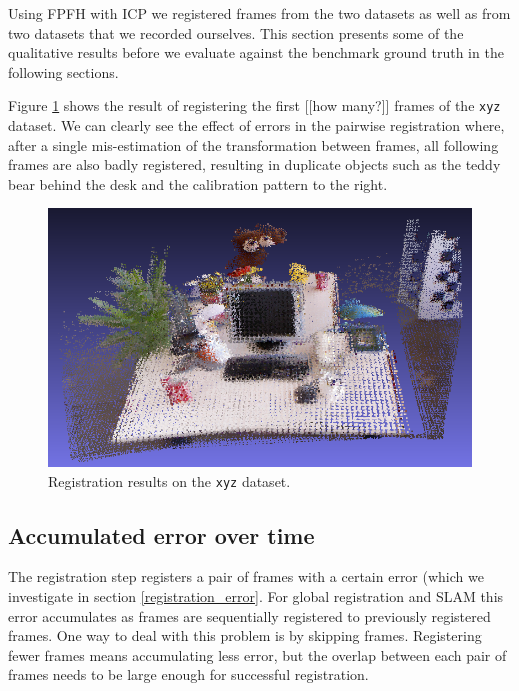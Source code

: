 \documentclass[a4paper]{article}
\begin{document}
Using \ac{FPFH} with \ac{ICP} we registered frames from the two datasets as well as from two datasets that we recorded ourselves. This section presents some of the qualitative results before we evaluate against the benchmark ground truth in the following sections.

Figure \ref{fig:xyz_results} shows the result of registering the first [[how many?]] frames of the \texttt{xyz} dataset. We can clearly see the effect of errors in the pairwise registration where, after a single mis-estimation of the transformation between frames, all following frames are also badly registered, resulting in duplicate objects such as the teddy bear behind the desk and the calibration pattern to the right.

\begin{figure}[htbp]
    \centering
        \includegraphics[width=\textwidth]{ims/xyz_results.png}
    \caption{Registration results on the \texttt{xyz} dataset.}
    \label{fig:xyz_results}
\end{figure}

\subsection{Accumulated error over time}
\label{accumulated_error}

The registration step registers a pair of frames with a certain error (which we investigate in section \ref{registration_error}. For global registration and \ac{SLAM} this error accumulates as frames are sequentially registered to previously registered frames. One way to deal with this problem is by skipping frames. Registering fewer frames means accumulating less error, but the overlap between each pair of frames needs to be large enough for successful registration. 
\end{document}
